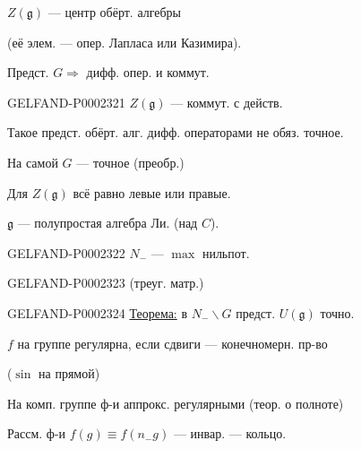 $Z(\mathfrak g)$ — центр обёрт. алгебры

(её элем. — опер. Лапласа или Казимира).



Предст. $G\Rightarrow$ дифф. опер. и коммут.



\begin{GelfandAdjacentEvidence}{GELFAND-P000232}{1}
$Z(\mathfrak g)$ — коммут. с действ. 
\end{GelfandAdjacentEvidence}


Такое предст. обёрт. алг. дифф. операторами не обяз. точное.



На самой $G$ — точное (преобр.)



Для $Z(\mathfrak g)$ всё равно левые или правые.



$\mathfrak g$ — полупростая алгебра Ли. (над $C$).



\begin{GelfandAdjacentEvidence}{GELFAND-P000232}{2}
$N_-$ — $\max$ нильпот. 
\end{GelfandAdjacentEvidence}
\begin{GelfandAdjacentEvidence}{GELFAND-P000232}{3}
 (треуг. матр.)

\end{GelfandAdjacentEvidence}


\begin{GelfandAdjacentEvidence}{GELFAND-P000232}{4}
\underline{Теорема:} в $N_-\backslash G$ предст. $U(\mathfrak g)$ точно.



\end{GelfandAdjacentEvidence}


$f$ на группе регулярна, если сдвиги — конечномерн. пр-во

($\sin$ на прямой)



На комп. группе ф-и аппрокс. регулярными (теор. о полноте)



Рассм. ф-и $f(g)\equiv f(n_-g)$ — инвар. — кольцо.



